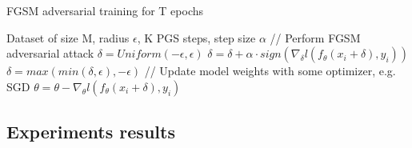 \documentclass{article}
\begin{document}
\begin{algorithm}[H]
	\caption{FGSM adversarial training for T epochs}
	\begin{algorithmic}[1]
		\Require Dataset of size M, radius $\epsilon$, K PGS steps, step size
		$\alpha$   \State // Perform FGSM
		adversarial attack \State $\delta = Uniform(-\epsilon, \epsilon)$ \State
		$\delta = \delta + \alpha \cdot sign(\nabla_{\delta} l(f_{\theta}(x_i +
		\delta), y_i))$ \State $\delta = max(min(\delta, \epsilon), -\epsilon)$
		\State // Update model weights with some optimizer, e.g. SGD \State $\theta
		= \theta - \nabla_{\theta} l(f_{\theta}(x_i + \delta), y_i)$ \EndFor \EndFor
	\end{algorithmic}
\end{algorithm}

\subsection{Experiments results}
\end{document}
